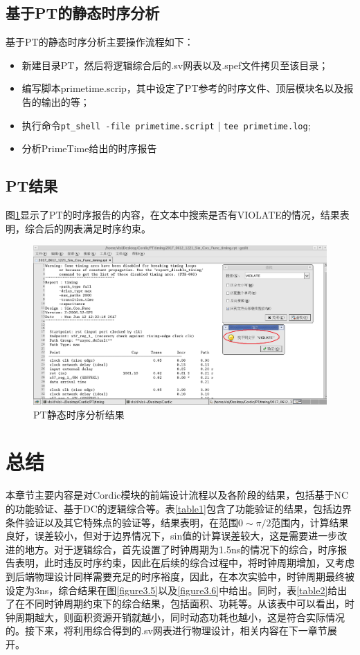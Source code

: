 \documentclass[a4paper,12pt]{report}
\begin{document}
\subsection{基于PT的静态时序分析}
基于PT的静态时序分析主要操作流程如下：
\begin{itemize}
\item 新建目录PT，然后将逻辑综合后的.sv网表以及.spef文件拷贝至该目录；
\item 编写脚本primetime.scrip，其中设定了PT参考的时序文件、顶层模块名以及报告的输出的等；
\item 执行命令\verb|pt_shell -file primetime.script| | \verb|tee primetime.log|;
\item 分析PrimeTime给出的时序报告
\end{itemize}
\subsection{PT结果}
图\ref{figure3.7}显示了PT的时序报告的内容，在文本中搜索是否有VIOLATE的情况，结果表明，综合后的网表满足时序约束。
\begin{figure}[!hbtp]
\centering
\includegraphics[width=1.0\textwidth]{PT1}
\caption{PT静态时序分析结果}
\label{figure3.7}
\end{figure}

\section{总结}
本章节主要内容是对Cordic模块的前端设计流程以及各阶段的结果，包括基于NC的功能验证、基于DC的逻辑综合等。表\ref{table1}包含了功能验证的结果，包括边界条件验证以及其它特殊点的验证等，结果表明，在范围$0 \sim \pi/2$范围内，计算结果良好，误差较小，但对于边界情况下，sin值的计算误差较大，这是需要进一步改进的地方。对于逻辑综合，首先设置了时钟周期为1.5ns的情况下的综合，时序报告表明，此时违反时序约束，因此在后续的综合过程中，将时钟周期增加，又考虑到后端物理设计同样需要充足的时序裕度，因此，在本次实验中，时钟周期最终被设定为3ns，综合结果在图\ref{figure3.5}以及\ref{figure3.6}中给出。同时，表\ref{table2}给出了在不同时钟周期约束下的综合结果，包括面积、功耗等。从该表中可以看出，时钟周期越大，则面积资源开销就越小，同时动态功耗也越小，这是符合实际情况的。接下来，将利用综合得到的.sv网表进行物理设计，相关内容在下一章节展开。
\end{document}
